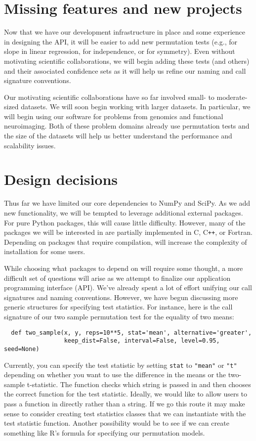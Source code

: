 \section{Missing features and new projects}

Now that we have our development infrastructure in place and some experience in
designing the API, it will be easier to add new permutation tests (e.g., for
slope in linear regression, for independence, or for symmetry).
Even without motivating scientific collaborations, we will begin adding these
tests (and others) and their associated confidence sets as it will help us
refine our naming and call signature conventions.

Our motivating scientific collaborations have so far involved small- to
moderate-sized datasets.  We will soon begin working with larger datasets.  In
particular, we will begin using our software for problems from genomics and
functional neuroimaging.  Both of these problem domains already use permutation
tests and the size of the datasets will help us better understand the
performance and scalability issues.

\section{Design decisions}

Thus far we have limited our core dependencies to NumPy and SciPy.
As we add new functionality, we will be tempted to leverage additional
external packages.  For pure Python packages, this will cause little
difficulty.  However, many of the packages we will be interested in
are partially implemented in C, C{}\verb!++!, or Fortran.  Depending
on packages that require compilation, will increase the complexity
of installation for some users.

While choosing what packages to depend on will require some thought, a more
difficult set of questions will arise as we attempt to finalize our application
programming interface (API).  We've already spent a lot of effort unifying our
call signatures and naming conventions.  However, we have begun discussing more
generic structures for specifying test statistics.  For instance,
here is the call signature of our two sample permutation test for the equality
of two means: 
\begin{verbatim}
  def two_sample(x, y, reps=10**5, stat='mean', alternative='greater',
                 keep_dist=False, interval=False, level=0.95, seed=None)
\end{verbatim}
Currently, you can specify the test statistic by setting \texttt{stat} to
\texttt{"mean"} or \texttt{"t"} depending on whether you want to use the
difference in the means or the two-sample t-statistic.  The function checks
which string is passed in and then chooses the correct function for the test
statistic.  Ideally, we would like to allow users to pass a function in
directly rather than a string.  If we go this route it may make sense to
consider creating test statistics classes that we can instantiate with the test
statistic function.  Another possibility would be to see if we can create
something like R's formula for specifying our permutation models.

